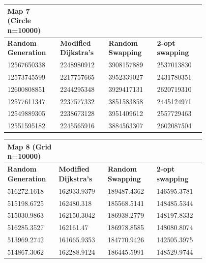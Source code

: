 \documentclass{article}
\begin{document}
\begin{table}[H]
    \centering
    \begin{tabular}{|p{0.2\linewidth}|p{0.2\linewidth}|p{0.2\linewidth}|p{0.2\linewidth}|}
    \hline
        \textbf{Map 7 (Circle n=10000)} & ~ & ~ & ~ \\ \hline
        \textbf{Random Generation} & \textbf{Modified Dijkstra's} & \textbf{Random Swapping} & \textbf{2-opt swapping} \\ \hline
        12567650338 & 2248980912 & 3908157889 & 2537013830 \\ \hline
        12573745599 & 2217757665 & 3952339027 & 2431780351 \\ \hline
        12600808851 & 2244295348 & 3929417131 & 2620719310 \\ \hline
        12577611347 & 2237577332 & 3851583858 & 2445124971 \\ \hline
        12549889305 & 2238673128 & 3951409612 & 2557729463 \\ \hline
        12551595182 & 2245565916 & 3884563307 & 2602087504 \\ \hline
    \end{tabular}
\end{table}

\begin{table}[H]
    \centering
    \begin{tabular}{|p{0.2\linewidth}|p{0.2\linewidth}|p{0.2\linewidth}|p{0.2\linewidth}|}
    \hline
        \textbf{Map 8 (Grid n=10000)} & ~ & ~ & ~ \\ \hline
        \textbf{Random Generation} & \textbf{Modified Dijkstra's} & \textbf{Random Swapping} & \textbf{2-opt swapping} \\ \hline
        516272.1618 & 162933.9379 & 189487.4362 & 146595.3781 \\ \hline
        515198.6725 & 162480.318 & 185568.5141 & 148485.5344 \\ \hline
        515030.9863 & 162150.3042 & 186938.2779 & 148197.8332 \\ \hline
        516285.3527 & 162161.47 & 186978.8585 & 148080.8074 \\ \hline
        513969.2742 & 161665.9353 & 184770.9426 & 142505.3975 \\ \hline
        514867.3062 & 162288.9124 & 186445.5991 & 148529.9744 \\ \hline
    \end{tabular}
\end{table}
\end{document}

